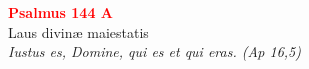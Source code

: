 


\def\greinitialformat#1{%
{\fontsize{39}{39}\selectfont #1}%
}




\vspace{0.3cm}
\begin{center}
 \textcolor{red}{\large \bf Psalmus 144 A}\\
Laus divinæ maiestatis\\
\textit{\small Iustus es, Domine, qui es et qui eras. (Ap 16,5)}
\end{center}
